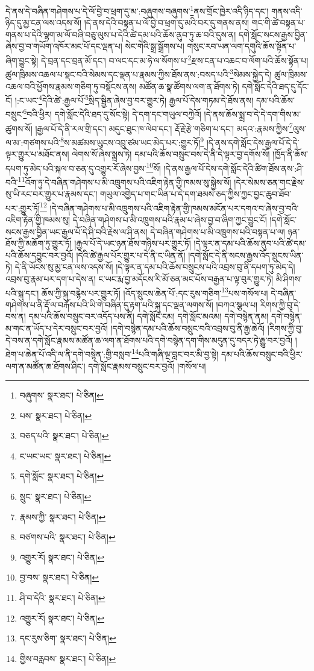 དེ་ནས་དེ་བཞིན་གཤེགས་པ་དེ་ལོ་བྱེ་བ་ཕྲག་དུ་མ་:བཞུགས་བཞུགས་\footnote{བཞུགས་  སྣར་ཐང་།  པེ་ཅིན། }ནས་གྲོང་ཁྱེར་འདི་ཉིད་དང་། གནས་འདི་ཉིད་དུ་མྱ་ངན་ལས་འདས་སོ། །དེ་ནས་དེའི་བསྟན་པ་ལོ་བྱེ་བ་ཕྲག་དུ་མའི་བར་དུ་གནས་ནས། གང་གི་ཚེ་བསྟན་པ་གནས་པ་དེའི་ལྷག་མ་ལོ་བཞི་བཅུ་ལུས་པ་དེའི་ཚེ་དམ་པའི་ཆོས་ནུབ་ཏུ་ཆ་བའི་དུས་ན། དགེ་སློང་སངས་རྒྱས་བྱིན་ཞེས་བྱ་བ་གཡོག་འཁོར་མང་པོ་དང་ལྡན་པ། སེང་གེའི་སྒྲ་སྒྲོགས་པ། གསུང་རབ་ཡན་ལག་དགུའི་ཆོས་སྟོན་པ་ཞིག་བྱུང་སྟེ། དེ་བྲན་དང་བྲན་མོ་དང་། བ་ལང་དང་མ་ཧེ་ལ་སོགས་པ་\footnote{པས་  སྣར་ཐང་།  པེ་ཅིན། }རྫས་ངན་པ་འཆང་བ་ལོག་པའི་ཆོས་སྟོན་པ། ཚུལ་ཁྲིམས་འཆལ་པ་སྡང་བའི་སེམས་དང་ལྡན་པ་རྣམས་ཀྱིས་ཐོས་ནས་:བསད་པའི་\footnote{བཅད་པའི་  སྣར་ཐང་།  པེ་ཅིན། }སེམས་སྐྱེད་དེ། ཚུལ་ཁྲིམས་འཆལ་བའི་ཕྱོགས་རྣམས་གཅིག་ཏུ་བསྡོངས་ནས། མཚོན་ཆ་སྣ་ཚོགས་ལག་ན་ཐོགས་ཏེ། དགེ་སློང་དེའི་ཐད་དུ་དོང་ངོ། །:ང་ཡང་\footnote{ང་ཡང་ཡང་  སྣར་ཐང་།  པེ་ཅིན། }དེའི་ཚེ་:རྒྱལ་པོ་\footnote{དགེ་སློང་  སྣར་ཐང་།  པེ་ཅིན། }སྲིད་སྦྱིན་ཞེས་བྱ་བར་གྱུར་ཏེ། རྒྱལ་པོ་དེས་གཏམ་དེ་ཐོས་ནས། དམ་པའི་ཆོས་བསྲུང་\footnote{སྲུང་  སྣར་ཐང་།  པེ་ཅིན། }བའི་ཕྱིར། དགེ་སློང་དེའི་ཐད་དུ་སོང་སྟེ། དེ་དག་དང་གཡུལ་བཀྱེའོ། །དེ་ནས་ཆོས་སྨྲ་བ་དེ་དེ་དག་གིས་མ་ཚུགས་སོ། །རྒྱལ་པོ་དེ་ནི་རལ་གྲི་དང་། མདུང་ཐུང་ཁ་ལེབ་དང་། རྡོ་རྗེ་རྩེ་གཅིག་པ་དང་། མདའ་:རྣམས་ཀྱིས་\footnote{རྣམས་ཀྱི་  སྣར་ཐང་།  པེ་ཅིན། }ལུས་ལ་མ་:གཙགས་པའི་\footnote{བཙགས་པའི་  སྣར་ཐང་།  པེ་ཅིན། }ས་མཚམས་ཡུངས་འབྲུ་ཙམ་ཡང་མེད་པར་:གྱུར་ཏོ།\footnote{འགྱུར་རོ།  སྣར་ཐང་།  པེ་ཅིན། } །དེ་ནས་དགེ་སློང་དེས་རྒྱལ་པོ་དེ་དེ་ལྟར་གྱུར་པ་མཐོང་ནས། ལེགས་སོ་ཞེས་སྨྲས་ཏེ། དམ་པའི་ཆོས་བསྲུང་བས་དེ་ནི་དེ་ལྟར་བྱ་དགོས་སོ། །ཁྱོད་ནི་ཆོས་དཔག་ཏུ་མེད་པའི་སྐལ་བ་ཅན་དུ་འགྱུར་རོ་ཞེས་བྱས་\footnote{བྱ་བས་  སྣར་ཐང་།  པེ་ཅིན། }སོ། །དེ་ནས་རྒྱལ་པོ་དེས་དགེ་སློང་དེའི་ཚིག་ཐོས་ནས་:ཤི་བའི་\footnote{ཤི་བ་དེའི་  སྣར་ཐང་།  པེ་ཅིན། }འོག་ཏུ་དེ་བཞིན་གཤེགས་པ་མི་འཁྲུགས་པའི་འཇིག་རྟེན་གྱི་ཁམས་སུ་སྐྱེས་སོ། །དེར་སེམས་ཅན་གང་རྗེས་སུ་ཡི་རང་བར་གྱུར་པ་རྣམས་དང་། གཡུལ་འགྱེད་པ་གང་ཡིན་པ་དེ་དག་ཐམས་ཅད་ཀྱིས་ཀྱང་བྱང་ཆུབ་ཐོབ་པར་:གྱུར་ཏོ།\footnote{འགྱུར་རོ།  སྣར་ཐང་།  པེ་ཅིན། } །དེ་བཞིན་གཤེགས་པ་མི་འཁྲུགས་པའི་འཇིག་རྟེན་གྱི་ཁམས་མངོན་པར་དགའ་བ་ཞེས་བྱ་བའི་འཇིག་རྟེན་གྱི་ཁམས་སུ། དེ་བཞིན་གཤེགས་པ་མི་འཁྲུགས་པའི་རྣམ་པ་ཞེས་བྱ་བ་ཞིག་ཀྱང་བྱུང་ངོ། །དགེ་སློང་སངས་རྒྱས་བྱིན་ཡང་རྒྱལ་པོ་དེ་ཤི་བའི་རྗེས་ལ་ཤི་ནས། དེ་བཞིན་གཤེགས་པ་མི་འཁྲུགས་པའི་བསྟན་པ་ལ། ཉན་ཐོས་ཀྱི་མཆོག་ཏུ་གྱུར་ཏོ། །རྒྱལ་པོ་དེ་ཡང་ཉན་ཐོས་གཉིས་པར་གྱུར་ཏོ། །དེ་ལྟར་ན་དམ་པའི་ཆོས་ནུབ་པའི་ཚེ་དམ་པའི་ཆོས་དབྱུང་བར་བྱའོ། །དེའི་ཚེ་རྒྱལ་པོར་གྱུར་པ་དེ་ནི་ང་ཡིན་ནོ། །དགེ་སློང་དེ་ནི་སངས་རྒྱས་འོད་སྲུངས་ཡིན་ཏེ། དེ་ནི་ཡོངས་སུ་མྱ་ངན་ལས་འདས་སོ། །དེ་ལྟར་ན་དམ་པའི་ཆོས་བསྲུངས་པའི་འབྲས་བུ་ནི་དཔག་ཏུ་མེད་དེ། འབྲས་བུ་རྣམ་པར་དག་པ་དེས་ན། ང་ཡང་རྨ་བྱ་མདོངས་རི་མོ་ཅན་མང་པོས་བརྒྱན་པ་ལྟ་བུར་གྱུར་ཏེ། མི་ཤིགས་པའི་སྐུ་དང་། ཆོས་ཀྱི་སྐུ་བརྙེས་པར་གྱུར་ཏོ། །འོད་སྲུངས་ཆེན་པོ་:དང་རུས་གཅིག་\footnote{དང་རུས་ཅིག་  སྣར་ཐང་།  པེ་ཅིན། }པས་གསོལ་པ། དེ་བཞིན་གཤེགས་པ་ནི་རྡོ་ལ་བརྐོས་པའི་ཡི་གེ་བཞིན་དུ་རྟག་པའི་སྐུ་དང་ལྡན་ལགས་སོ། །བཀའ་སྩལ་པ། རིགས་ཀྱི་བུ་དེ་བས་ན། དམ་པའི་ཆོས་བསྲུང་བར་འདོད་པས་ནི། དགེ་སློང་ངམ། དགེ་སློང་མའམ། དགེ་བསྙེན་ནམ། དགེ་བསྙེན་མ་གང་ན་ཡོད་པ་དེར་བསྲུང་བར་བྱའོ། །དགེ་བསྙེན་དམ་པའི་ཆོས་བསྲུང་བའི་འབྲས་བུ་ནི་རྒྱ་ཆེའོ། །རིགས་ཀྱི་བུ་དེ་བས་ན་དགེ་སློང་རྣམས་མཚོན་ཆ་ལག་ན་ཐོགས་པའི་དགེ་བསྙེན་དག་གིས་མདུན་དུ་བདར་ཏེ་རྒྱུ་བར་བྱའོ། །ཐེག་པ་ཆེན་པོ་འདི་ལ་ནི་དགེ་བསྙེན་:གྱི་བསླབ་\footnote{གྱིས་བརླབས་  སྣར་ཐང་།  པེ་ཅིན། }པའི་གཞི་ལྔ་བླང་བར་མི་བྱ་སྟེ། དམ་པའི་ཆོས་བསྲུང་བའི་ཕྱིར་ལག་ན་མཚོན་ཆ་ཐོགས་ཤིང་། དགེ་སློང་རྣམས་བསྲུང་བར་བྱའོ། །གསོལ་པ། 